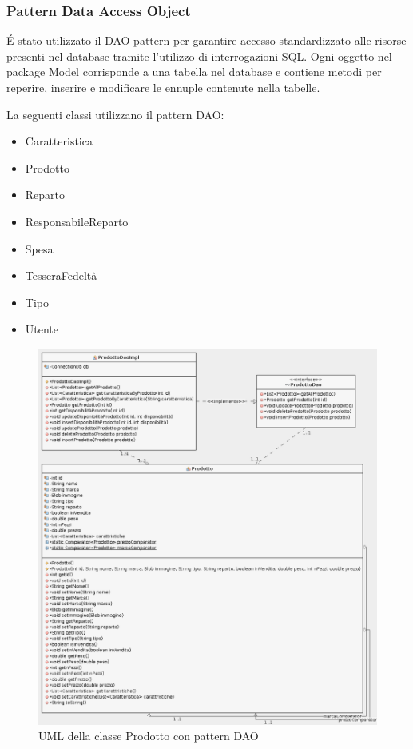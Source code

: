 \documentclass{article}
\begin{document}
\subsubsection{Pattern Data Access Object}
\'E stato utilizzato il DAO pattern per garantire accesso standardizzato alle risorse presenti nel database
tramite l'utilizzo di interrogazioni SQL.
Ogni oggetto nel package Model corrisponde a una tabella nel database e contiene metodi per reperire, inserire
e modificare le ennuple contenute nella tabelle.


\noindent La seguenti classi utilizzano il pattern DAO:
\begin{itemize}
	\item Caratteristica
	\item Prodotto
	\item Reparto
	\item ResponsabileReparto
	\item Spesa
	\item TesseraFedeltà
	\item Tipo
	\item Utente
\end{itemize}

\begin{figure}[h!]
	\centering
	\includegraphics[width=\textwidth]{UmlProdotto.png}
	\caption{UML della classe Prodotto con pattern DAO}
	\label{fig:UmlProdotto}
\end{figure}
\clearpage
\end{document}
